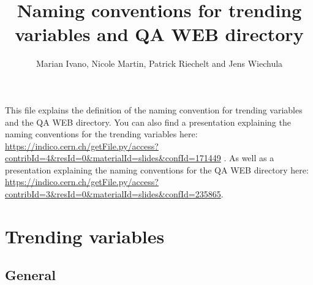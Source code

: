 \documentclass[11pt,a4paper]{article}
\begin{document}
\title{Naming conventions for trending variables and QA WEB directory}
\author{Marian Ivano, Nicole Martin, Patrick Riechelt and Jens Wiechula}
\maketitle

This file explains the definition of the naming convention for trending variables and the QA WEB directory. You can also find a presentation explaining the naming conventions for the trending variables here:  
\url{https://indico.cern.ch/getFile.py/access?contribId=4&resId=0&materialId=slides&confId=171449} . 
As well as a presentation explaining the naming conventions for the QA WEB directory here:
\url{https://indico.cern.ch/getFile.py/access?contribId=3&resId=0&materialId=slides&confId=235865}.

\section{Trending variables}

\subsection{General}
\end{document}
